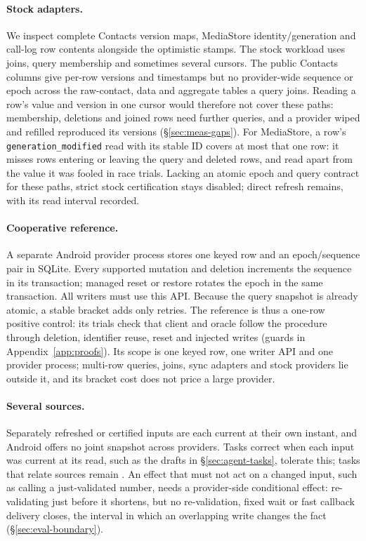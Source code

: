 \paragraph{Stock adapters.} We inspect complete Contacts version maps, MediaStore identity/generation and call-log row contents alongside the optimistic stamps. The stock workload uses joins, query membership and sometimes several cursors. The public Contacts columns give per-row versions and timestamps but no provider-wide sequence or epoch across the raw-contact, data and aggregate tables a query joins. Reading a row's value and version in one cursor would therefore not cover these paths: membership, deletions and joined rows need further queries, and a provider wiped and refilled reproduced its versions (\S\ref{sec:meas-gaps}). For MediaStore, a row's \texttt{generation\_modified} read with its stable ID covers at most that one row: it misses rows entering or leaving the query and deleted rows, and read apart from the value it was fooled in \PhysRaceMediaStampedStale race trials. Lacking an atomic epoch and query contract for these paths, strict stock certification stays disabled; direct refresh remains, with its read interval recorded.

\paragraph{Cooperative reference.} A separate Android provider process stores one keyed row and an epoch/sequence pair in SQLite. Every supported mutation and deletion increments the sequence in its transaction; managed reset or restore rotates the epoch in the same transaction. All writers must use this API. Because the query snapshot is already atomic, a stable bracket adds only retries. The reference is thus a one-row positive control: its \RevReference trials check that client and oracle follow the procedure through deletion, identifier reuse, reset and injected writes (guards in Appendix~\ref{app:proofs}). Its scope is one keyed row, one writer API and one provider process; multi-row queries, joins, sync adapters and stock providers lie outside it, and its bracket cost does not price a large provider.

\paragraph{Several sources.} Separately refreshed or certified inputs are each current at their own instant, and Android offers no joint snapshot across providers. Tasks correct when each input was current at its read, such as the drafts in \S\ref{sec:agent-tasks}, tolerate this; tasks that relate sources remain \Unknown. An effect that must not act on a changed input, such as calling a just-validated number, needs a provider-side conditional effect: re-validating just before it shortens, but no re-validation, fixed wait or fast callback delivery closes, the interval in which an overlapping write changes the fact (\S\ref{sec:eval-boundary}).
